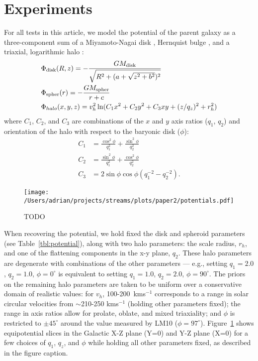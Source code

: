 \documentclass[letterpaper,12pt,preprint]{aastex}
\begin{document}
\section{Experiments}

For all tests in this article, we model the potential of the parent galaxy as a three-component sum of a Miyamoto-Nagai disk \citep{}, Hernquist bulge \citep[spheroid;][]{}, and a triaxial, logarithmic halo \citep[e.g.,][]{law10}:
\begin{align}
	&\Phi_{\rm disk}(R,z) = -\frac{GM_{\rm disk}}{\sqrt{R^2 + (a + \sqrt{z^2 + b^2})^2}}\\
	&\Phi_{\rm spher}(r) = -\frac{GM_{\rm spher}}{r + c}\\
	&\Phi_{halo}(x,y,z) = v_{h}^2 \ln(C_1 x^2 + C_2 y^2 + C_3 xy + (z/q_z)^2 + r_h^2)
\end{align}
where $C_1$, $C_2$, and $C_3$ are combinations of the $x$ and $y$ axis
ratios ($q_1$, $q_2$) and orientation of the halo with respect to the
baryonic disk ($\phi$):
\begin{align}
  C_1 &= \frac{\cos^2\phi}{q_1^2} + \frac{\sin^2\phi}{q_2^2}\\
  C_2 &= \frac{\sin^2\phi}{q_1^2} + \frac{\cos^2\phi}{q_2^2}\\
  C_3 &= 2\sin\phi\cos\phi \left(q_1^{-2} - q_2^{-2}\right).
\end{align}

\begin{figure}[h]
\begin{center}
\texttt{[image: /Users/adrian/projects/streams/plots/paper2/potentials.pdf]}
\caption{ TODO }\label{fig:potential}
\end{center}
\end{figure}

When recovering the potential, we hold fixed the disk and spheroid parameters (see Table~\ref{tbl:potential}), along with two halo parameters: the scale radius, $r_h$, and one of the flattening components in the x-y plane, $q_2$. These halo parameters are degenerate with combinations of the other parameters --- e.g., setting $q_1=2.0$, $q_2=1.0$, $\phi=0^\circ$ is equivalent to setting $q_1=1.0$, $q_2=2.0$, $\phi=90^\circ$. The priors on the remaining halo parameters are taken to be uniform over a conservative domain of realistic values: for $v_h$, 100-200~kms$^{-1}$ corresponds to a range in solar circular velocities from $\sim$210-250 kms$^{-1}$ (holding other parameters fixed); the range in axis ratios allow for prolate, oblate, and mixed triaxiality; and $\phi$ is restricted to $\pm45^\circ$ around the value measured by LM10 ($\phi = 97^\circ$). Figure~\ref{fig:potential} shows equipotential slices in the Galactic X-Z plane (Y=0) and Y-Z plane (X=0) for a few choices of  $q_1$,  $q_z$, and $\phi$ while holding all other parameters fixed, as described in the figure caption.
\end{document}
